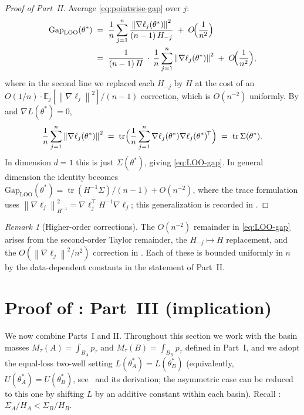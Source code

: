 \documentclass[11pt,a4paper]{article}
\theoremstyle{definition}
\theoremstyle{remark}
\newtheorem{remark}[theorem]{Remark}
\DeclareMathOperator{\tr}{tr}
\newcommand{\E}{\mathbb{E}}
\newcommand{\Gap}{\mathrm{Gap}}
\newcommand{\LOO}{\mathrm{LOO}}
\newcommand{\norm}[1]{\left\|#1\right\|}
\begin{document}
\begin{proof}[Proof of  Part~II]
   Average \eqref{eq:pointwise-gap} over $j$:
   \begin{align*}
      \Gap_{\LOO}(\theta^*)
      &\;=\; \frac{1}{n}\sum_{j=1}^n
             \frac{\norm{\nabla\ell_j(\theta^*)}^2}{(n-1)\,H_{-j}}
             \;+\; O\!\Bigl(\frac{1}{n^2}\Bigr)\\
      &\;=\; \frac{1}{(n-1)\,H}\,
             \cdot\,\frac{1}{n}\sum_{j=1}^n
                  \norm{\nabla\ell_j(\theta^*)}^2
             \;+\; O\!\Bigl(\frac{1}{n^2}\Bigr),
   \end{align*}
   where in the second line we replaced each $H_{-j}$ by $H$ at the cost
   of an $O(1/n)\cdot \E_j[\norm{\nabla\ell_j}^2]/(n-1)$ correction, which
   is $O(n^{-2})$ uniformly.  By  and
   $\nabla L(\theta^*) = 0$,
   \[
      \frac{1}{n}\sum_{j=1}^n \norm{\nabla\ell_j(\theta^*)}^2
      \;=\; \tr\Bigl(\frac{1}{n}\sum_{j=1}^n
              \nabla\ell_j(\theta^*)\nabla\ell_j(\theta^*)^{\!\top}\Bigr)
      \;=\; \tr\Sigma(\theta^*).
   \]
   In dimension $d=1$ this is just $\Sigma(\theta^*)$, giving
   \eqref{eq:LOO-gap}.  In general dimension the identity becomes
   $\Gap_{\LOO}(\theta^*) = \tr(H^{-1}\Sigma)/(n-1) + O(n^{-2})$, where
   the trace formulation uses
   $\norm{\nabla\ell_j}^2_{H^{-1}} = \nabla\ell_j^{\!\top} H^{-1}
                                                          \nabla\ell_j$;
   this generalization is recorded in .
\end{proof}

\begin{remark}[Higher-order corrections]\label{rem:higher-order}
   The $O(n^{-2})$ remainder in \eqref{eq:LOO-gap} arises from the
   second-order Taylor remainder, the $H_{-j}\mapsto H$ replacement, and
   the $O(\norm{\nabla\ell_j}^2/n^2)$ correction in
   .  Each of these is bounded uniformly in $n$ by
   the data-dependent constants in the statement of Part~II.
\end{remark}

\section{Proof of : Part~III (implication)}
\label{sec:proof-3}

We now combine Parts~I and II.  Throughout this section we work with
the basin masses $M_\tau(A) = \int_{B_A} p_\tau$ and
$M_\tau(B) = \int_{B_B} p_\tau$ defined in Part~I, and we adopt the
equal-loss two-well setting $L(\theta_A^*) = L(\theta_B^*)$
(equivalently, $U(\theta_A^*) = U(\theta_B^*)$, see~ and
its derivation; the asymmetric case can be reduced to this one by
shifting $L$ by an additive constant within each basin).
Recall : $\Sigma_A/H_A < \Sigma_B/H_B$.
\end{document}
